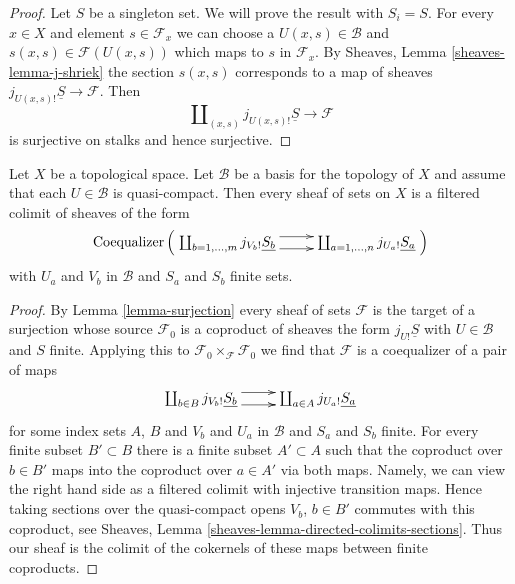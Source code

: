 \begin{proof}
Let $S$ be a singleton set. We will prove the result with $S_i = S$.
For every $x \in X$ and element $s \in \mathcal{F}_x$ we can choose
a $U(x, s) \in \mathcal{B}$ and $s(x, s) \in \mathcal{F}(U(x, s))$
which maps to $s$ in $\mathcal{F}_x$. By
Sheaves, Lemma \ref{sheaves-lemma-j-shriek}
the section $s(x, s)$
corresponds to a map of sheaves $j_{U(x, s)!}\underline{S} \to \mathcal{F}$.
Then
$$
\coprod\nolimits_{(x, s)} j_{U(x, s)!}\underline{S} \to \mathcal{F}
$$
is surjective on stalks and hence surjective.
\end{proof}

\begin{lemma}
\label{lemma-filtered-colimit-constructibles}
Let $X$ be a topological space. Let $\mathcal{B}$ be a basis for the
topology of $X$ and assume that each $U \in \mathcal{B}$ is quasi-compact.
Then every sheaf of sets on $X$ is a filtered colimit of sheaves of the form
\begin{equation}
\label{equation-towards-constructible-sets}
\text{Coequalizer}\left(
\xymatrix{
\coprod\nolimits_{b = 1, \ldots, m} j_{V_b!}\underline{S_b}
\ar@<1ex>[r] \ar@<-1ex>[r] &
\coprod\nolimits_{a = 1, \ldots, n} j_{U_a!}\underline{S_a}
}
\right)
\end{equation}
with $U_a$ and $V_b$ in $\mathcal{B}$ and $S_a$ and $S_b$ finite sets.
\end{lemma}

\begin{proof}
By Lemma \ref{lemma-surjection} every sheaf of sets $\mathcal{F}$
is the target of a surjection whose source $\mathcal{F}_0$ is a coproduct
of sheaves the form $j_{U!}\underline{S}$ with $U \in \mathcal{B}$
and $S$ finite. Applying this to
$\mathcal{F}_0 \times_\mathcal{F} \mathcal{F}_0$
we find that $\mathcal{F}$ is a coequalizer of a pair of maps
$$
\xymatrix{
\coprod\nolimits_{b \in B} j_{V_b!}\underline{S_b}
\ar@<1ex>[r] \ar@<-1ex>[r] &
\coprod\nolimits_{a \in A} j_{U_a!}\underline{S_a}
}
$$
for some index sets $A$, $B$ and $V_b$ and $U_a$ in $\mathcal{B}$ and
$S_a$ and $S_b$ finite. For every finite subset $B' \subset B$
there is a finite subset $A' \subset A$ such that the coproduct
over $b \in B'$ maps into the coproduct over $a \in A'$ via both maps.
Namely, we can view the right hand side as a filtered colimit with
injective transition maps. Hence taking sections over the quasi-compact
opens $V_b$, $b \in B'$ commutes with this coproduct,
see Sheaves, Lemma \ref{sheaves-lemma-directed-colimits-sections}.
Thus our sheaf is the colimit of the cokernels of these maps
between finite coproducts.
\end{proof}

